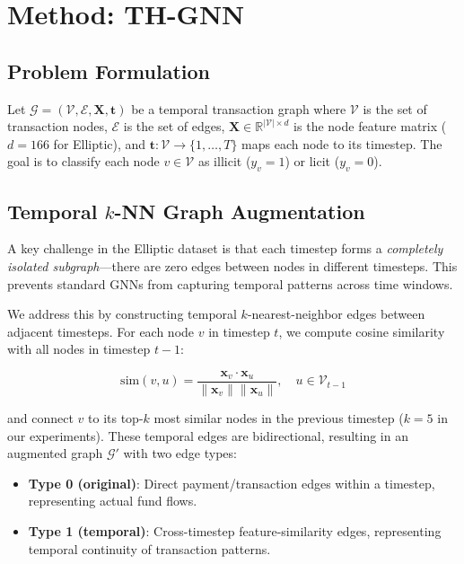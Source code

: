 \section{Method: TH-GNN}

\subsection{Problem Formulation}

Let $\mathcal{G} = (\mathcal{V}, \mathcal{E}, \mathbf{X}, \mathbf{t})$ be a temporal transaction graph where $\mathcal{V}$ is the set of transaction nodes, $\mathcal{E}$ is the set of edges, $\mathbf{X} \in \mathbb{R}^{|\mathcal{V}| \times d}$ is the node feature matrix ($d = 166$ for Elliptic), and $\mathbf{t}: \mathcal{V} \rightarrow \{1, \ldots, T\}$ maps each node to its timestep. The goal is to classify each node $v \in \mathcal{V}$ as illicit ($y_v = 1$) or licit ($y_v = 0$).

\subsection{Temporal $k$-NN Graph Augmentation}
\label{sec:temporal_knn}

A key challenge in the Elliptic dataset is that each timestep forms a \emph{completely isolated subgraph}---there are zero edges between nodes in different timesteps. This prevents standard GNNs from capturing temporal patterns across time windows.

We address this by constructing temporal $k$-nearest-neighbor edges between adjacent timesteps. For each node $v$ in timestep $t$, we compute cosine similarity with all nodes in timestep $t-1$:

\begin{equation}
    \text{sim}(v, u) = \frac{\mathbf{x}_v \cdot \mathbf{x}_u}{\|\mathbf{x}_v\| \|\mathbf{x}_u\|}, \quad u \in \mathcal{V}_{t-1}
\end{equation}

and connect $v$ to its top-$k$ most similar nodes in the previous timestep ($k = 5$ in our experiments). These temporal edges are bidirectional, resulting in an augmented graph $\mathcal{G}'$ with two edge types:

\begin{itemize}
    \item \textbf{Type 0 (original)}: Direct payment/transaction edges within a timestep, representing actual fund flows.
    \item \textbf{Type 1 (temporal)}: Cross-timestep feature-similarity edges, representing temporal continuity of transaction patterns.
\end{itemize}

